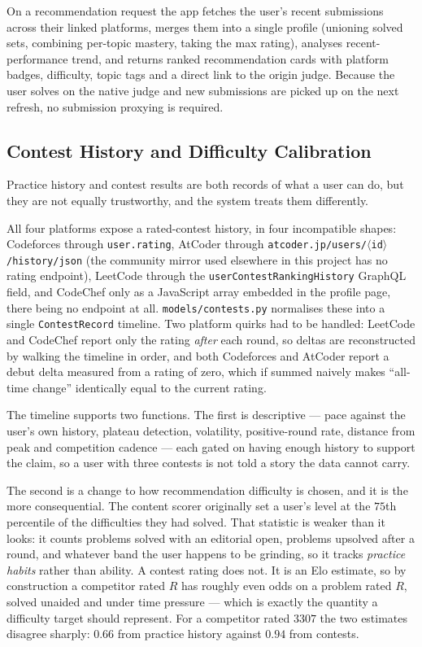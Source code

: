 \documentclass[12pt,a4paper]{article}
\begin{document}
On a
recommendation request the app fetches the user's recent submissions across their linked
platforms, merges them into a single profile (unioning solved sets, combining per-topic
mastery, taking the max rating), analyses recent-performance trend, and returns ranked
recommendation cards with platform badges, difficulty, topic tags and a direct link to
the origin judge. Because the user solves on the native judge and new submissions are picked up on the
next refresh, no submission proxying is required.

\subsection{Contest History and Difficulty Calibration}
\label{sec:impl-contests}
Practice history and contest results are both records of what a user can do, but they
are not equally trustworthy, and the system treats them differently.

All four platforms expose a rated-contest history, in four incompatible shapes:
Codeforces through \texttt{user.rating}, AtCoder through
\texttt{atcoder.jp/users/$\langle$id$\rangle$/history/json} (the community mirror used
elsewhere in this project has no rating endpoint), LeetCode through the
\texttt{userContestRankingHistory} GraphQL field, and CodeChef only as a JavaScript array
embedded in the profile page, there being no endpoint at all.
\texttt{models/contests.py} normalises these into a single \texttt{ContestRecord}
timeline. Two platform quirks had to be handled: LeetCode and CodeChef report only the
rating \emph{after} each round, so deltas are reconstructed by walking the timeline in
order, and both Codeforces and AtCoder report a debut delta measured from a rating of
zero, which if summed naively makes ``all-time change'' identically equal to the current
rating.

The timeline supports two functions. The first is descriptive --- pace against the
user's own history, plateau detection, volatility, positive-round rate, distance from
peak and competition cadence --- each gated on having enough history to support the
claim, so a user with three contests is not told a story the data cannot carry.

The second is a change to how recommendation difficulty is chosen, and it is the more
consequential. The content scorer originally set a user's level at the $75$th percentile
of the difficulties they had solved. That statistic is weaker than it looks: it counts
problems solved with an editorial open, problems upsolved after a round, and whatever
band the user happens to be grinding, so it tracks \emph{practice habits} rather than
ability. A contest rating does not. It is an Elo estimate, so by construction a
competitor rated $R$ has roughly even odds on a problem rated $R$, solved unaided and
under time pressure --- which is exactly the quantity a difficulty target should
represent. For a competitor rated $3307$ the two estimates disagree sharply: $0.66$ from
practice history against $0.94$ from contests.
\end{document}

